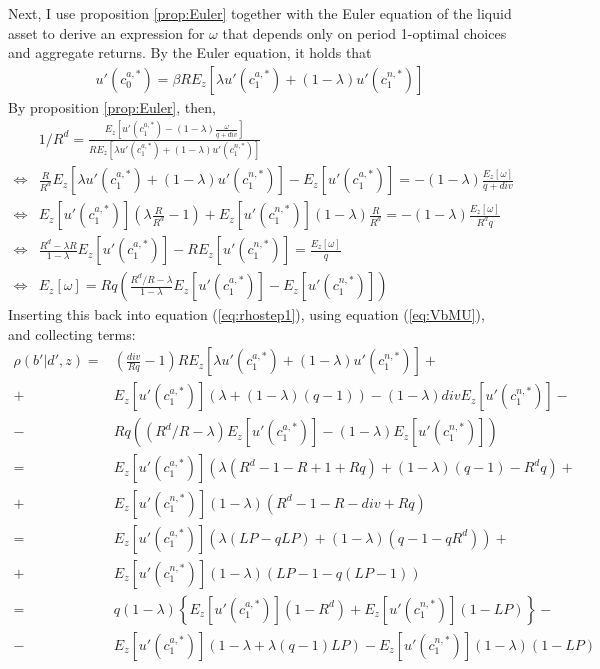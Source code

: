 \documentclass[11pt]{article} %
\begin{document}
Next, I use proposition \ref{prop:Euler} together with the Euler equation of the liquid asset to derive an expression for $\omega$ that depends only on period 1-optimal choices and aggregate returns. By the Euler equation, it holds that
\begin{align}
u'(c^{a,*}_0) = \beta R E_z [\lambda u'(c^{a,*}_1)+(1-\lambda) u'(c^{n,*}_1)]
\end{align}
By proposition \ref{prop:Euler}, then,
\begin{align}
&1/R^d = \frac{E_z\left[ u'(c^{a,*}_1)-(1-\lambda)\frac{\omega}{q+div}\right] }{RE_z[\lambda u'(c^{a,*}_1)+(1-\lambda)u'(c^{n,*}_1)]}\\
\Leftrightarrow& \frac{R}{R^d}E_z[\lambda u'(c^{a,*}_1)+(1-\lambda) u'(c^{n,*}_1)] - E_z[u'(c_1^{a,*})] = -(1-\lambda)\frac{E_z[\omega]}{q+div}\\
\Leftrightarrow & E_z[u'(c^{a,*}_1)] \left( \lambda \frac{R}{R^d} - 1\right) + E_z[u'(c^{n,*}_1)] (1-\lambda) \frac{R}{R^d} = -(1-\lambda) \frac{E_z[\omega]}{R^d q}\\
\Leftrightarrow &\frac{R^d - \lambda R}{1-\lambda} E_z[u'(c^{a,*}_1)] - R E_z[u'(c^{n,*}_1)]  = \frac{E_z[\omega]}{q}\\
\Leftrightarrow & E_z[\omega] = Rq \left( \frac{R^d/R-\lambda}{1-\lambda} E_z[u'(c^{a,*}_1)]-E_z[u'(c^{n,*}_1)] \right)
\end{align}
Inserting this back into equation (\ref{eq:rhostep1}), using equation (\ref{eq:VbMU}), and collecting terms:
\begin{align}
\rho(b'|d',z)=&\left(\frac{div}{Rq}-1\right) R E_z[\lambda u'(c^{a,*}_1)+(1-\lambda)u'(c^{n,*}_1)] +\nonumber \\
+&  E_z[u'(c^{a,*}_1)](\lambda + (1-\lambda)(q-1)) - (1-\lambda)div E_z[u'(c^{n,*}_1)] -\nonumber \\- &  Rq ( (R^d/R-\lambda) E_z[u'(c^{a,*}_1)] - (1-\lambda) E_z[u'(c^{n,*}_1)])\\
= & E_z[u'(c^{a,*}_1)]\left(\lambda (R^d-1-R+1+Rq)+(1-\lambda)(q-1)-R^dq\right) + \nonumber \\
+& E_z[u'(c^{n,*}_1)](1-\lambda)(R^d-1-R-div+Rq)\\
= & E_z[u'(c^{a,*}_1)] \left( \lambda(LP - qLP) + (1-\lambda)(q-1-qR^d) \right)+\nonumber \\+ &E_z[u'(c^{n,*}_1)](1-\lambda)\left(LP - 1 - q(LP - 1)\right)\\
=& q(1-\lambda) \left\{ E_z[u'(c^{a,*}_1)] (1-R^d) + E_z[u'(c^{n,*}_1)] (1-LP) \right\}- \nonumber \\
-& E_z[u'(c^{a,*}_1)]( 1-\lambda+\lambda(q-1)LP)-E_z[u'(c^{n,*}_1)](1-\lambda)(1-LP)
\end{align}
\end{document}
